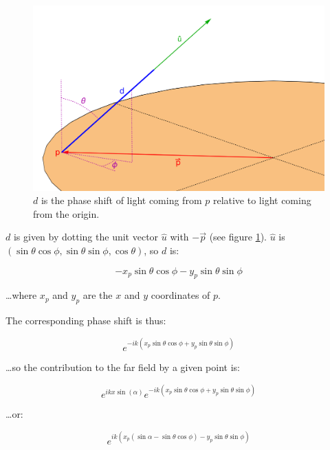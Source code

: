 \documentclass[etd,senior,noacknowledgments]{BYUPhys}
\begin{document}
\begin{figure}
  \centerline{\includegraphics[width=\textwidth]{phase-length}}
  \caption[Phase length of a beam of light]{\label{fig:phase_length}
    $d$ is the phase shift of light coming from $p$ relative to light coming from the origin.}
\end{figure}

$d$ is given by dotting the unit vector $\hat{u}$ with $-\vec{p}$ (see figure \ref{fig:phase_length}). $\hat{u}$ is $\left(\sin{\theta}\cos{\phi},\sin{\theta}\sin{\phi},\cos{\theta}\right)$, so $d$ is:

\begin{equation}
  -x_p\sin{\theta}\cos{\phi}-y_p\sin{\theta}\sin{\phi}
\end{equation}

\ldots where $x_p$ and $y_p$ are the $x$ and $y$ coordinates of $p$.

The corresponding phase shift is thus:

\begin{equation}
  e^{-ik(x_p\sin{\theta}\cos{\phi}+y_p\sin{\theta}\sin{\phi})}
\end{equation}

\ldots so the contribution to the far field by a given point is:

\begin{equation}
  e^{ikx\sin\left({\alpha}\right)}e^{-ik(x_p\sin{\theta}\cos{\phi}+y_p\sin{\theta}\sin{\phi})}
\end{equation}

\ldots or:

\begin{equation}
  e^{ik\left(x_p(\sin{\alpha}-\sin{\theta}\cos{\phi})-y_p\sin{\theta}\sin{\phi}\right)}
\end{equation}
\end{document}
